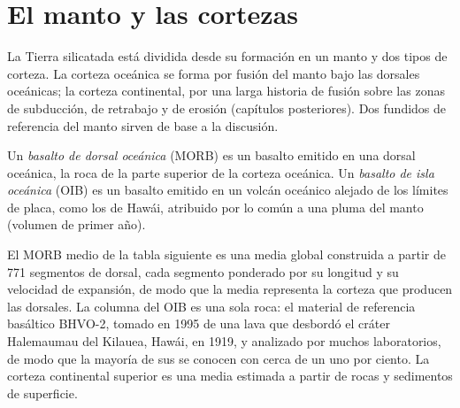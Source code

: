 \section{El manto y las cortezas}

La Tierra silicatada está dividida desde su formación en un manto y dos
tipos de corteza. La corteza oceánica se forma por fusión del manto bajo las
dorsales oceánicas; la corteza continental, por una larga historia de fusión sobre las
zonas de subducción, de retrabajo y de erosión (capítulos posteriores). Dos fundidos de referencia
del manto sirven de base a la discusión.

\begin{definition}
\label{def:b2:elements-in-the-earth:morb-oib}
Un \emph{basalto de dorsal oceánica} (MORB) es un basalto
emitido en una dorsal oceánica, la roca de la parte superior de la corteza oceánica. Un
\emph{basalto de isla oceánica} (OIB) es un basalto emitido
en un volcán oceánico alejado de los límites de placa, como los de Hawái,
atribuido por lo común a una pluma del manto (volumen de primer año).
\end{definition}

El MORB medio de la tabla siguiente es una media global construida a partir de 771 segmentos
de dorsal, cada segmento ponderado por su longitud y su velocidad de expansión, de modo que la
media representa la corteza que producen las dorsales. La columna del OIB
es una sola roca: el material de referencia basáltico BHVO-2, tomado en 1995
de una lava que desbordó el cráter Halemaumau del Kilauea, Hawái, en 1919,
y analizado por muchos laboratorios, de modo que la mayoría de sus  se conocen con
cerca de un uno por ciento. La corteza continental superior es una media estimada a partir de
rocas y sedimentos de superficie.

